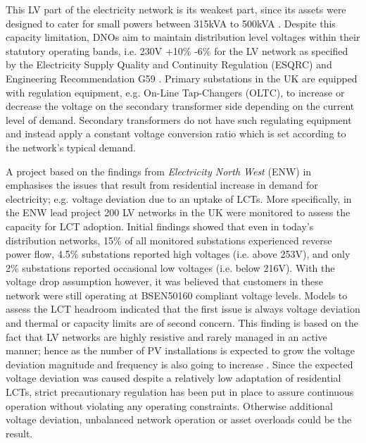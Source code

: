 This LV part of the electricity network is its weakest part, since its assets were designed to cater for small powers between 315kVA to 500kVA \cite{EDS08-0115}.
Despite this capacity limitation, DNOs aim to maintain distribution level voltages within their statutory operating bands, i.e. 230V +10\% -6\% for the LV network as specified by the Electricity Supply Quality and Continuity Regulation (ESQRC) \cite{HealthandSafetyExecutive2002} and Engineering Recommendation G59 \cite{EnergyNetworksAssociation2013}.
Primary substations in the UK are equipped with regulation equipment, e.g. On-Line Tap-Changers (OLTC), to increase or decrease the voltage on the secondary transformer side depending on the current level of demand.
Secondary transformers do not have such regulating equipment and instead apply a constant voltage conversion ratio which is set according to the network's typical demand.

A project based on the findings from \textit{Electricity North West} (ENW) in \cite{ElectricityNorthWestLtd2014} emphasises the issues that result from residential increase in demand for electricity; e.g. voltage deviation due to an uptake of LCTs.
More specifically, in the ENW lead project 200 LV networks in the UK were monitored to assess the capacity for LCT adoption.
Initial findings showed that even in today's distribution networks, 15\% of all monitored substations experienced reverse power flow, 4.5\% substations reported high voltages (i.e. above 253V), and only 2\% substations reported occasional low voltages (i.e. below 216V).
With the voltage drop assumption however, it was believed that customers in these network were still operating at BSEN50160 compliant voltage levels.
Models to assess the LCT headroom indicated that the first issue is always voltage deviation and thermal or capacity limits are of second concern.
This finding is based on the fact that LV networks are highly resistive and rarely managed in an active manner; hence as the number of PV installations is expected to grow the voltage deviation magnitude and frequency is also going to increase \cite{Woyte2006}.
Since the expected voltage deviation was caused despite a relatively low adaptation of residential LCTs, strict precautionary regulation has been put in place to assure continuous operation without violating any operating constraints.
Otherwise additional voltage deviation, unbalanced network operation or asset overloads could be the result.

